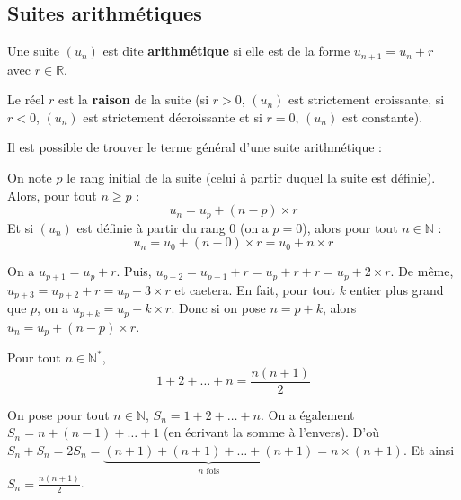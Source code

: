 	\subsection{Suites arithmétiques}
	
	\begin{formula}[Définition]
		Une suite $(u_n)$ est dite \textbf{arithmétique} si elle est de la forme $u_{n+1} = u_n + r$ avec $r \in \mathbb{R}$.
	\end{formula}
	
	\begin{formula}[Raison]
		Le réel $r$ est la \textbf{raison} de la suite (si $r > 0$, $(u_n)$ est strictement croissante, si $r < 0$, $(u_n)$ est strictement décroissante et si $r = 0$, $(u_n)$ est constante).
	\end{formula}
	
	Il est possible de trouver le terme général d'une suite arithmétique :
	
	\begin{formula}
		On note $p$ le rang initial de la suite (celui à partir duquel la suite est définie). Alors, pour tout $n \geq p$ :
		\[ u_n = u_p + (n-p) \times r \]
		Et si $(u_n)$ est définie à partir du rang $0$ (on a $p = 0$), alors pour tout $n \in \mathbb{N}$ :
		\[ u_n = u_0 + (n-0) \times r = u_0 + n \times r \]
	\end{formula}
	
	\begin{demonstration}
		On a $u_{p+1} = u_p + r$. Puis, $u_{p+2} = u_{p+1} + r = u_p + r + r = u_p + 2 \times r$. De même, $u_{p+3} = u_{p+2} + r = u_p + 3 \times r$  et caetera.
		\newline
		En fait, pour tout $k$ entier plus grand que $p$, on a $u_{p+k} = u_p + k \times r$.
		\newline
		Donc si on pose $n = p+k$, alors $u_n = u_p + (n-p) \times r$.
	\end{demonstration}
	
	\begin{formula}
		Pour tout $n \in \mathbb{N}^*$,
		\[ 1 + 2 + \dots + n = \frac{n(n + 1)}{2} \]
	\end{formula}
	
	\begin{demonstration}
		On pose pour tout $n \in \mathbb{N}$, $S_n = 1 + 2 + \dots + n$. On a également $S_n = n + (n-1) + \dots + 1$ (en écrivant la somme à l'envers).
		\newline
		D'où $S_n + S_n = 2S_n = \underbrace{(n + 1) + (n + 1) + \dots + (n + 1)}_{n \text{ fois}} = n \times (n + 1)$. Et ainsi $S_n = \frac{n(n + 1)}{2}$.
	\end{demonstration}
	
